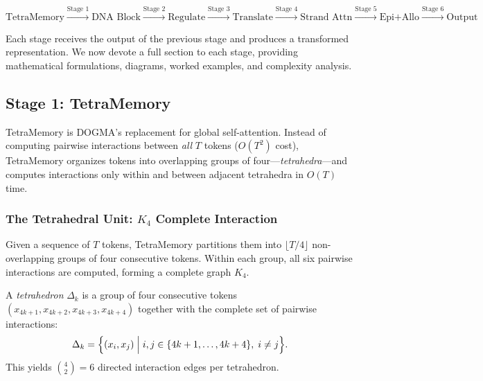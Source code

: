 \begin{equation}
\boxed{
\text{TetraMemory} \xrightarrow{\text{Stage 1}}
\text{DNA Block} \xrightarrow{\text{Stage 2}}
\text{Regulate} \xrightarrow{\text{Stage 3}}
\text{Translate} \xrightarrow{\text{Stage 4}}
\text{Strand Attn} \xrightarrow{\text{Stage 5}}
\text{Epi+Allo} \xrightarrow{\text{Stage 6}}
\text{Output}
}
\label{eq:dogma-pipeline}
\end{equation}

Each stage receives the output of the previous stage and produces a transformed representation. We now devote a full section to each stage, providing mathematical formulations, diagrams, worked examples, and complexity analysis.

\subsection{Stage 1: TetraMemory}
\label{sec:stage-tetramemory}

TetraMemory is DOGMA's replacement for global self-attention. Instead of computing pairwise interactions between \emph{all} $T$ tokens ($O(T^2)$ cost), TetraMemory organizes tokens into overlapping groups of four---\emph{tetrahedra}---and computes interactions only within and between adjacent tetrahedra in $O(T)$ time.

\subsubsection{The Tetrahedral Unit: $K_4$ Complete Interaction}

Given a sequence of $T$ tokens, TetraMemory partitions them into $\lfloor T/4 \rfloor$ non-overlapping groups of four consecutive tokens. Within each group, all six pairwise interactions are computed, forming a complete graph $K_4$.

\begin{definition}[Tetrahedron]
\label{def:tetrahedron}
A \emph{tetrahedron} $\Delta_k$ is a group of four consecutive tokens $(x_{4k+1}, x_{4k+2}, x_{4k+3}, x_{4k+4})$ together with the complete set of pairwise interactions:
\begin{equation}
\Delta_k = \Bigl\{ (x_i, x_j) \;\Big|\; i, j \in \{4k+1, \ldots, 4k+4\},\; i \neq j \Bigr\}.
\end{equation}
This yields $\binom{4}{2} = 6$ directed interaction edges per tetrahedron.
\end{definition}

